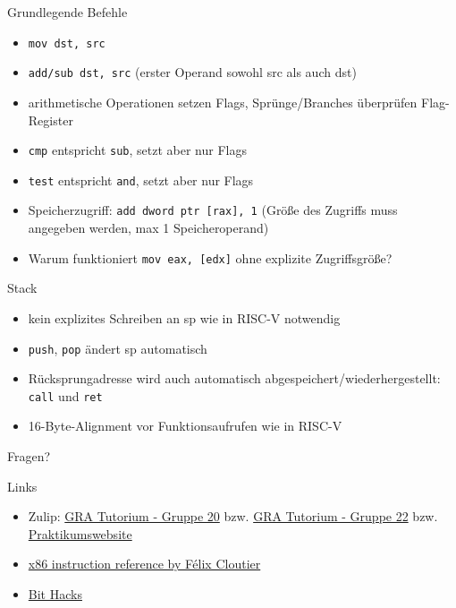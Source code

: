 \documentclass[
  german,            %
  aspectratio=169,    %
]{tumbeamer}
\begin{document}
\begin{frame}[c, fragile]{Grundlegende Befehle}{}
  \begin{itemize}
    \item \verb|mov dst, src|
    \item \verb|add/sub dst, src| (erster Operand sowohl src als auch dst)
    \item arithmetische Operationen setzen Flags, Sprünge/Branches überprüfen Flag-Register
    \item \verb|cmp| entspricht \verb|sub|, setzt aber nur Flags
    \item \verb|test| entspricht \verb|and|, setzt aber nur Flags
    \item Speicherzugriff: \verb|add dword ptr [rax], 1| (Größe des Zugriffs muss angegeben werden, max 1 Speicheroperand)
    \item Warum funktioniert \verb|mov eax, [edx]| ohne explizite Zugriffsgröße?
  \end{itemize}
\end{frame}

\begin{frame}[c, fragile]{Stack}{}
  \begin{itemize}
    \item kein explizites Schreiben an sp wie in RISC-V notwendig
    \item \verb|push|, \verb|pop| ändert sp automatisch
    \item Rücksprungadresse wird auch automatisch abgespeichert/wiederhergestellt: \verb|call| und \verb|ret|
    \item 16-Byte-Alignment vor Funktionsaufrufen wie in RISC-V
  \end{itemize}
\end{frame}

\begin{frame}[c]{}{}
  \begin{center}
    \LARGE Fragen?
  \end{center}
\end{frame}

\begin{frame}[fragile, c]{Links}{}
  \begin{itemize}
    \item Zulip: \href{https://zulip.in.tum.de/#narrow/stream/2267-GRA-Tutorium---Gruppe-20}{\glqq GRA Tutorium - Gruppe 20\grqq}
          bzw. \href{https://zulip.in.tum.de/#narrow/stream/2269-GRA-Tutorium---Gruppe-22}{\glqq GRA Tutorium - Gruppe 22\grqq}
          bzw. \href{https://gra.caps.in.tum.de}{\glqq Praktikumswebsite\grqq}
    \item \href{https://www.felixcloutier.com/x86/}{x86 instruction reference by Félix Cloutier}
    \item \href{https://graphics.stanford.edu/~seander/bithacks.html#CountBitsSetParallel}{Bit Hacks}
  \end{itemize}
\end{frame}

\maketitle
\end{document}
